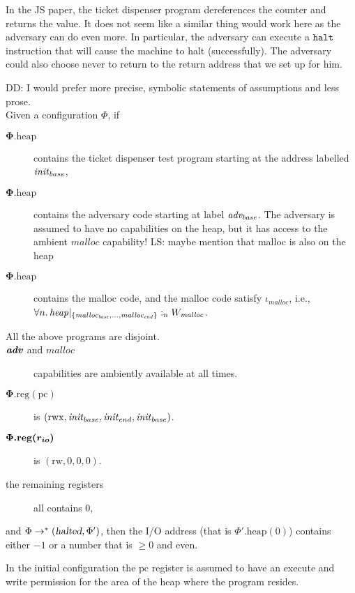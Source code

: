 \documentclass[a4paper]{article}
\newcommand{\restrictfun}[1]{|_{#1}}
\newcommand\lau[1]{{\color{purple} \sf \footnotesize {LS: #1}}\\}
\newcommand\dominique[1]{{\color{purple} \sf \footnotesize {DD: #1}}\\}
\newcommand{\var}[1]{\mathit{#1}}
\newcommand{\pcreg}{\mathrm{pc}}
\newcommand{\heap}{\var{heap}}
\newcommand{\plainproj}[1]{\mathrm{#1}}
\newcommand{\memheap}[1][\Phi]{#1.\plainproj{heap}}
\newcommand{\memreg}[1][\Phi]{#1.\plainproj{reg}}
\newcommand{\halted}{\textsl{halted}}
\newcommand{\heapSat}[3][\heap]{#1 :_{#2} #3}
\newcommand{\codelabel}[1]{\mathit{#1}}
\newcommand{\malloc}{\codelabel{malloc}}
\newcommand{\zinstr}[1]{\mathtt{#1}}
\newcommand{\halt}{\zinstr{halt}}
\newcommand{\plainperm}[1]{\mathrm{#1}}
\newcommand{\readwrite}{\plainperm{rw}}
\newcommand{\rwx}{\plainperm{rwx}}
\begin{document}
In the JS paper, the ticket dispenser program dereferences the counter and returns the value. It does not seem like a similar thing would work here as the adversary can do even more. In particular, the adversary can execute a $\halt$ instruction that will cause the machine to halt (successfully). The adversary could also choose never to return to the return address that we set up for him.
\begin{lemma}\dominique{I would prefer more precise, symbolic statements of assumptions and less prose.}
\label{lem:tckt-disp}
 Given a configuration $\Phi$, if
 \begin{description}
 \item[$\boldsymbol \memheap$] contains the ticket dispenser test program starting at the address labelled $\initb$, 
 \item[$\boldsymbol \memheap$] contains the adversary code starting at label $\advb$. The adversary is assumed to have no capabilities on the heap, but it has access to the ambient $\malloc$ capability! \lau{maybe mention that malloc is also on the heap}
 \item[$\boldsymbol \memheap$] contains the malloc code, and the malloc code satisfy $\iota_{\malloc}$, i.e., $\forall n \ldotp \heapSat[{\heap\restrictfun{\{\malloc_{\var{base}}, \dots ,\malloc_{\var{end}}\}}}]{n}{W_{\malloc}}$.
 \item[All the above programs are disjoint.]
 \item[$\boldsymbol{\adv}$ and $\boldsymbol{ \codelabel{malloc}}$] capabilities are ambiently available at all times.
 \item[$\boldsymbol{ \memreg(\pcreg)}$] is $(\rwx,\initb,\inite,\initb)$.
 \item[$\boldsymbol{ \memreg(\rio)}$] is $(\readwrite,0,0,0)$.
 \item[the remaining registers] all contains 0,
 \end{description}
 and $\Phi \rightarrow^* (\halted,\Phi')$, then the I/O address (that is $\memheap[\Phi'](0)$) contains either $-1$ or a number that is $\geq 0$ and even.
\end{lemma}
In the initial configuration the $\pcreg$ register is assumed to have an execute and write permission for the area of the heap where the program resides.
\end{document}
